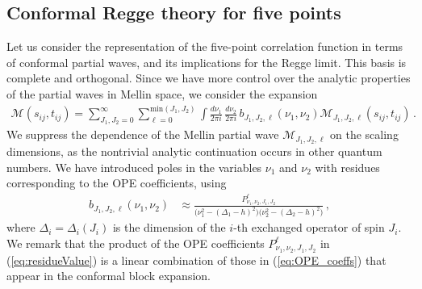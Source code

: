 \subsection{Conformal Regge theory for five points}
\label{subsec:SWtransform}

Let us consider the representation of the five-point correlation function in terms of  conformal partial waves, and its implications for the Regge limit.
This basis  is complete and orthogonal.
Since we have more control over the analytic properties of the  partial waves in Mellin space, we consider the  expansion
\begin{align}
  \mathcal{M}(s_{ij},t_{ij} )= \sum_{J_1,J_2=0}^{\infty} \sum_{\ell=0}^{\textrm{min} \left( J_1, J_2 \right)}\int \frac{d \nu_1}{2\pi i}\,\frac{d \nu_2}{2\pi i}\, b_{J_1,J_2,\ell}(\nu_1,\nu_2)
  \mathcal{M}_{J_1,J_2,\ell}(s_{ij},t_{ij})
  \,.
  \label{eq:partialWave}
\end{align}
We suppress the dependence of the Mellin partial wave $ \mathcal{M}_{J_1,J_2,\ell} $ on the scaling dimensions, as the nontrivial analytic continuation occurs in other quantum numbers.
We have introduced  poles in the variables $ \nu_1$ and  $\nu_2 $ with residues corresponding to the OPE coefficients, using
\begin{align}
  b_{J_1,J_2,\ell}\left( \nu_1,\nu_2 \right) & \approx
  \frac{
    P_{\nu_1,\nu_2,J_1,J_2}^{\ell}
  }{
    \big( \nu_1^2- \left( \Delta_1 - h \right)^2 \big) \big( \nu_2^2- \left( \Delta_2 - h \right)^2 \big)
  }\,,
  \label{eq:residueValue}
\end{align}
where $\Delta_i=\Delta_i(J_i)$ is the dimension of the $i$-th exchanged operator of spin $J_i$.
We remark that  the product of the OPE coefficients   $P_{\nu_1,\nu_2,J_1,J_2}^{\ell}$ in (\ref{eq:residueValue}) is a linear combination
of those in (\ref{eq:OPE_coeffs}) that appear in the conformal block expansion. 


